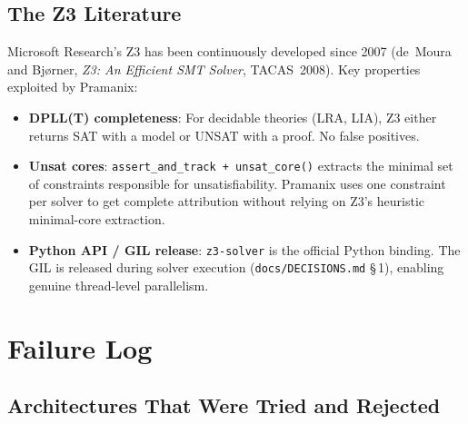 \documentclass[12pt,a4paper,oneside]{report}
\newcommand{\fname}[1]{\texttt{#1}}          %
\newcommand{\code}[1]{\texttt{#1}}           %
\newcommand{\cfrsec}[1]{\S\,#1}             %
\begin{document}
\section{The Z3 Literature}

Microsoft Research's Z3 has been continuously developed since 2007 (de~Moura
and Bj\o{}rner, \textit{Z3: An Efficient SMT Solver}, TACAS~2008). Key
properties exploited by Pramanix:

\begin{itemize}
  \item \textbf{DPLL(T) completeness}: For decidable theories (LRA, LIA), Z3
        either returns SAT with a model or UNSAT with a proof. No false
        positives.
  \item \textbf{Unsat cores}: \code{assert\_and\_track + unsat\_core()} extracts
        the minimal set of constraints responsible for unsatisfiability.
        Pramanix uses one constraint per solver to get complete attribution
        without relying on Z3's heuristic minimal-core extraction.
  \item \textbf{Python API / GIL release}: \code{z3-solver} is the official
        Python binding. The GIL is released during solver execution
        (\fname{docs/DECISIONS.md} \cfrsec{1}), enabling genuine thread-level
        parallelism.
\end{itemize}

\chapter{Failure Log}

\section{Architectures That Were Tried and Rejected}
\end{document}
